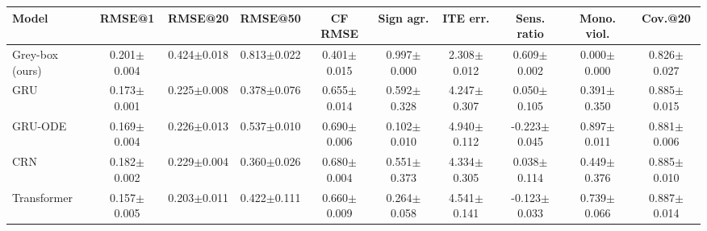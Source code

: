 \begin{tabular}{lccccccccc}
\toprule
Model & RMSE@1 & RMSE@20 & RMSE@50 & CF RMSE & Sign agr. & ITE err. & Sens. ratio & Mono. viol. & Cov.@20 \\
\midrule
Grey-box (ours) & 0.201$\pm$0.004 & 0.424$\pm$0.018 & 0.813$\pm$0.022 & 0.401$\pm$0.015 & 0.997$\pm$0.000 & 2.308$\pm$0.012 & 0.609$\pm$0.002 & 0.000$\pm$0.000 & 0.826$\pm$0.027 \\
GRU & 0.173$\pm$0.001 & 0.225$\pm$0.008 & 0.378$\pm$0.076 & 0.655$\pm$0.014 & 0.592$\pm$0.328 & 4.247$\pm$0.307 & 0.050$\pm$0.105 & 0.391$\pm$0.350 & 0.885$\pm$0.015 \\
GRU-ODE & 0.169$\pm$0.004 & 0.226$\pm$0.013 & 0.537$\pm$0.010 & 0.690$\pm$0.006 & 0.102$\pm$0.010 & 4.940$\pm$0.112 & -0.223$\pm$0.045 & 0.897$\pm$0.011 & 0.881$\pm$0.006 \\
CRN & 0.182$\pm$0.002 & 0.229$\pm$0.004 & 0.360$\pm$0.026 & 0.680$\pm$0.004 & 0.551$\pm$0.373 & 4.334$\pm$0.305 & 0.038$\pm$0.114 & 0.449$\pm$0.376 & 0.885$\pm$0.010 \\
Transformer & 0.157$\pm$0.005 & 0.203$\pm$0.011 & 0.422$\pm$0.111 & 0.660$\pm$0.009 & 0.264$\pm$0.058 & 4.541$\pm$0.141 & -0.123$\pm$0.033 & 0.739$\pm$0.066 & 0.887$\pm$0.014 \\
\bottomrule
\end{tabular}
